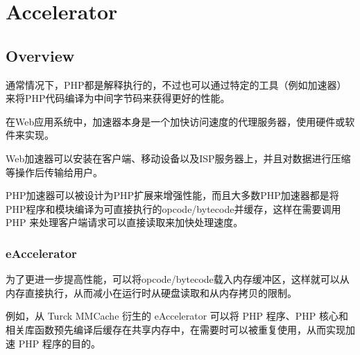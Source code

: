 \begin{lstlisting}[language=bash]

\end{lstlisting}




\begin{lstlisting}[language=bash]

\end{lstlisting}





\begin{lstlisting}[language=bash]

\end{lstlisting}


\chapter{Accelerator}


\section{Overview}



通常情况下，PHP都是解释执行的，不过也可以通过特定的工具（例如加速器）来将PHP代码编译为中间字节码来获得更好的性能。


在Web应用系统中，加速器本身是一个加快访问速度的代理服务器，使用硬件或软件来实现。

Web加速器可以安装在客户端、移动设备以及ISP服务器上，并且对数据进行压缩等操作后传输给用户。

PHP加速器可以被设计为PHP扩展来增强性能，而且大多数PHP加速器都是将PHP程序和模块编译为可直接执行的opcode/bytecode并缓存，这样在需要调用 PHP 来处理客户端请求可以直接读取来加快处理速度。





\subsection{eAccelerator}



为了更进一步提高性能，可以将opcode/bytecode载入内存缓冲区，这样就可以从内存直接执行，从而减小在运行时从硬盘读取和从内存拷贝的限制。




例如，从 Turck MMCache 衍生的 eAccelerator 可以将 PHP 程序、PHP 核心和相关库函数预先编译后缓存在共享内存中，在需要时可以被重复使用，从而实现加速 PHP 程序的目的。


